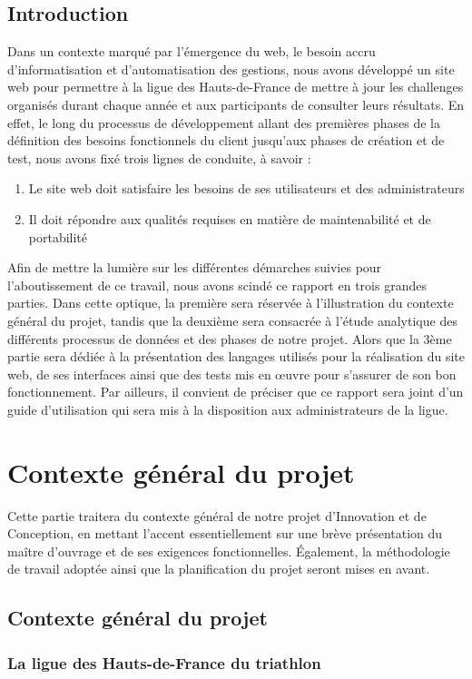 \documentclass[12pt,a4paper]{report}
\begin{document}
	\section*{Introduction}
	Dans un contexte marqué par l’émergence du web, le besoin accru d'informatisation et d'automatisation des gestions, nous avons développé un site web pour permettre à la ligue des Hauts-de-France de mettre à jour les challenges organisés durant chaque année et aux participants de consulter leurs résultats.
	En effet, le long du processus de développement allant des premières phases de la définition des besoins fonctionnels du client jusqu’aux phases de création et de test, nous avons fixé trois lignes de conduite, à savoir :
	\begin{enumerate}
	\item Le site web doit satisfaire les besoins de ses utilisateurs et des administrateurs
	\item Il doit répondre aux qualités requises en matière de maintenabilité et de portabilité
	\end{enumerate}
	Afin de mettre la lumière sur les différentes démarches suivies pour l’aboutissement de ce travail, nous avons scindé ce rapport en trois grandes parties. Dans cette optique, la première sera réservée à l’illustration du contexte général du projet, tandis que la deuxième sera consacrée à l’étude analytique des différents processus de données et des phases de notre projet. Alors que la 3ème partie sera dédiée à la présentation des langages utilisés pour la réalisation du site web, de ses interfaces ainsi que des tests mis en œuvre pour s’assurer de son bon fonctionnement. Par ailleurs, il convient de préciser que ce rapport sera joint d’un guide d’utilisation qui sera mis à la disposition aux administrateurs de la ligue.
	\chapter{Contexte général du projet}
	Cette partie traitera du contexte général de notre projet d’Innovation et de Conception, en mettant l’accent essentiellement sur une brève présentation du maître d'ouvrage et de ses exigences fonctionnelles. Également, la méthodologie de travail adoptée ainsi que la planification du projet seront mises en avant.  
	
	\newpage
	\section {Contexte général du projet}
	\subsection{La ligue des Hauts-de-France du triathlon }
	
\end{document}
